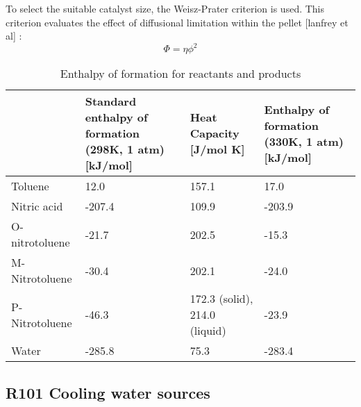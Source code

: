 To select the suitable catalyst size, the Weisz-Prater criterion is used. This criterion evaluates the effect of diffusional limitation within the pellet [lanfrey et al] :
\begin{equation}
    \Phi = \eta \phi^2
\end{equation}

\begin{table}[H]
\centering
\caption{Enthalpy of formation for reactants and products}
\label{tab:Heat enthalpy table}
\begin{tabularx}{\linewidth}{l|XXX}
\toprule
                                                                & Standard enthalpy of formation (298K, 1 atm) [kJ/mol] & Heat Capacity [J/mol K] & Enthalpy of formation (330K, 1 atm) [kJ/mol] \\ \midrule
Toluene                        & 12.0              & 157.1              & 17.0                     \\
Nitric acid                      & -207.4              & 109.9              & -203.9                       \\
O-nitrotoluene & -21.7             & 202.5              & -15.3              \\ 
M-Nitrotoluene                      & -30.4              & 202.1             & -24.0                       \\
P-Nitrotoluene                      & -46.3              & 172.3 (solid), 214.0 (liquid)             & -23.9                        \\
Water                     & -285.8              & 75.3              & -283.4                        \\
\bottomrule
\end{tabularx}
\end{table}

\subsection{R101 Cooling water sources}
\label{sec:R101-CW}

\begin{table}[h]
\centering
\caption{Cooling water sources for R101}
\label{tab:cwtable}
\end{table}

